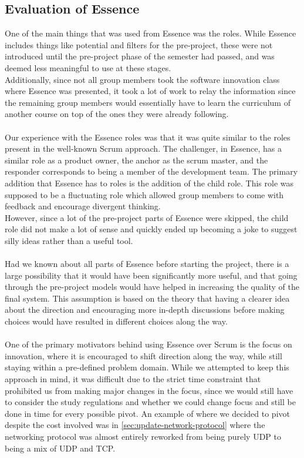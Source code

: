 \subsection{Evaluation of Essence}
One of the main things that was used from Essence was the roles.
While Essence includes things like potential and filters for the pre-project, these were not introduced until the pre-project phase of the semester had passed, and was deemed less meaningful to use at these stages.\\
Additionally, since not all group members took the software innovation class where Essence was presented, it took a lot of work to relay the information since the remaining group members would essentially have to learn the curriculum of another course on top of the ones they were already following.
\\\\
Our experience with the Essence roles was that it was quite similar to the roles present in the well-known Scrum approach.
The challenger, in Essence, has a similar role as a product owner, the anchor as the scrum master, and the responder corresponds to being a member of the development team.
The primary addition that Essence has to roles is the addition of the child role.
This role was supposed to be a fluctuating role which allowed group members to come with feedback and encourage divergent thinking.\\
However, since a lot of the pre-project parts of Essence were skipped, the child role did not make a lot of sense and quickly ended up becoming a joke to suggest silly ideas rather than a useful tool.
\\\\
Had we known about all parts of Essence before starting the project, there is a large possibility that it would have been significantly more useful, and that going through the pre-project models would have helped in increasing the quality of the final system.
This assumption is based on the theory that having a clearer idea about the direction and encouraging more in-depth discussions before making choices would have resulted in different choices along the way.
\\\\
One of the primary motivators behind using Essence over Scrum is the focus on innovation, where it is encouraged to shift direction along the way, while still staying within a pre-defined problem domain.
While we attempted to keep this approach in mind, it was difficult due to the strict time constraint that prohibited us from making major changes in the focus, since we would still have to consider the study regulations and whether we could change focus and still be done in time for every possible pivot.
An example of where we decided to pivot despite the cost involved was in \autoref{sec:update-network-protocol} where the networking protocol was almost entirely reworked from being purely UDP to being a mix of UDP and TCP.

